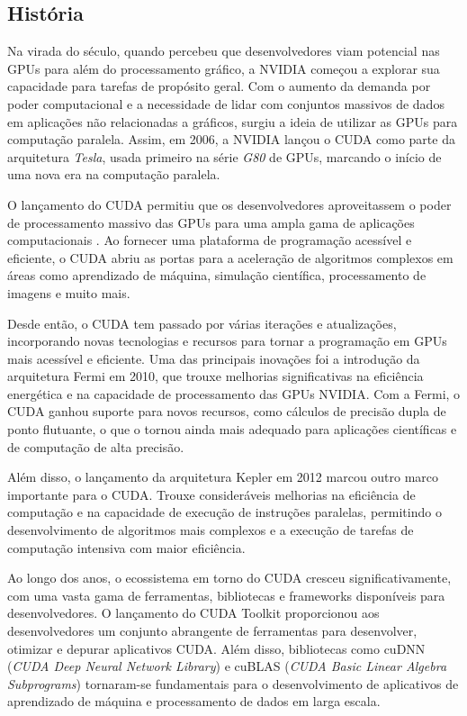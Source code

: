 \documentclass[12pt,
openright, 
oneside, %
a4paper,    %
brazil]{facom-ufu-abntex2}
\begin{document}

\subsection{História}
\label{ssc:históriaCUDA}

Na virada do século, quando percebeu que desenvolvedores viam potencial nas GPUs para além do processamento gráfico, a NVIDIA começou a explorar sua capacidade para tarefas de propósito geral. Com o aumento da demanda por poder computacional e a necessidade de lidar com conjuntos massivos de dados em aplicações não relacionadas a gráficos, surgiu a ideia de utilizar as GPUs para computação paralela. Assim, em 2006, a NVIDIA lançou o CUDA como parte da arquitetura \textit{Tesla}, usada primeiro na série \textit{G80} de GPUs, marcando o início de uma nova era na computação paralela.

O lançamento do CUDA permitiu que os desenvolvedores aproveitassem o poder de processamento massivo das GPUs para uma ampla gama de aplicações computacionais \cite{cudaByExampleSanders2010}. Ao fornecer uma plataforma de programação acessível e eficiente, o CUDA abriu as portas para a aceleração de algoritmos complexos em áreas como aprendizado de máquina, simulação científica, processamento de imagens e muito mais.

Desde então, o CUDA tem passado por várias iterações e atualizações, incorporando novas tecnologias e recursos para tornar a programação em GPUs mais acessível e eficiente. Uma das principais inovações foi a introdução da arquitetura Fermi em 2010, que trouxe melhorias significativas na eficiência energética e na capacidade de processamento das GPUs NVIDIA. Com a Fermi, o CUDA ganhou suporte para novos recursos, como cálculos de precisão dupla de ponto flutuante, o que o tornou ainda mais adequado para aplicações científicas e de computação de alta precisão.

Além disso, o lançamento da arquitetura Kepler em 2012 marcou outro marco importante para o CUDA. Trouxe consideráveis melhorias na eficiência de computação e na capacidade de execução de instruções paralelas, permitindo o desenvolvimento de algoritmos mais complexos e a execução de tarefas de computação intensiva com maior eficiência.

Ao longo dos anos, o ecossistema em torno do CUDA cresceu significativamente, com uma vasta gama de ferramentas, bibliotecas e frameworks disponíveis para desenvolvedores. O lançamento do CUDA Toolkit proporcionou aos desenvolvedores um conjunto abrangente de ferramentas para desenvolver, otimizar e depurar aplicativos CUDA. Além disso, bibliotecas como cuDNN (\textit{CUDA Deep Neural Network Library}) e cuBLAS (\textit{CUDA Basic Linear Algebra Subprograms}) tornaram-se fundamentais para o desenvolvimento de aplicativos de aprendizado de máquina e processamento de dados em larga escala.
\end{document}
